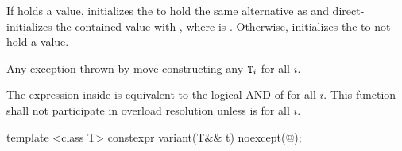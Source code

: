 \begin{itemdescr}
\pnum
\effects
If  holds a value, initializes the  to hold the same
alternative as  and direct-initializes the contained value with
, where  is .
Otherwise, initializes the  to not hold a value.

\pnum
\throws
Any exception thrown by move-constructing any $\texttt{T}_i$ for all $i$.

\pnum
\remarks
The expression inside  is equivalent to the logical AND of
 for all $i$.
This function shall not participate in overload resolution unless
 is  for all $i$.
\end{itemdescr}

%
\begin{itemdecl}
template <class T> constexpr variant(T&& t) noexcept(@\seebelow@);
\end{itemdecl}

